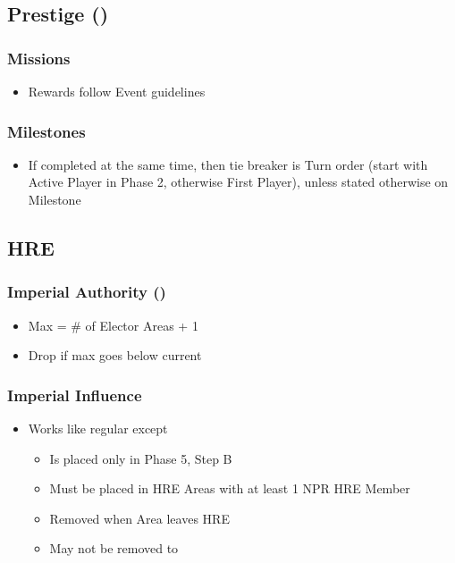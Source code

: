 \documentclass[10pt]{article}
\begin{document}
\subsection*{Prestige (\prestige) }

\subsubsection*{Missions }
\begin{itemize}
	\item Rewards follow Event guidelines
\end{itemize}

\subsubsection*{Milestones }
\begin{itemize}
	\item If completed at the same time, then tie breaker is Turn order (start with Active Player in Phase 2, otherwise First Player), unless stated otherwise on Milestone
\end{itemize}

\subsection*{HRE }
\subsubsection*{Imperial Authority (\authority) }
\begin{itemize}
	\item Max \authority = \# of Elector Areas + 1
	\item Drop \authority if max \authority goes below current \authority
\end{itemize}

\subsubsection*{Imperial Influence }
\begin{itemize}
	\item Works like regular \influence except
	\begin{itemize}
		\item Is placed only in Phase 5, Step B
		\item Must be placed in HRE Areas with at least 1 NPR HRE Member
		\item Removed when Area leaves HRE
		\item May not be removed to 
	\end{itemize}
\end{itemize}
\end{document}
